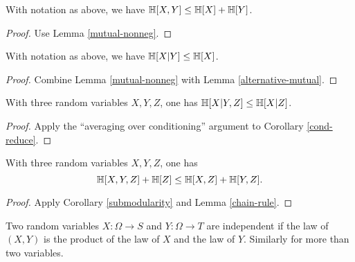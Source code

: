 \begin{corollary}[Subadditivity]
  \label{subadditive}
  \leanok
  With notation as above, we have $\mathbb{H}[X,Y] \leq \mathbb{H}[X] + \mathbb{H}[Y]$.
\end{corollary}

\begin{proof}
  \leanok
  Use Lemma \ref{mutual-nonneg}.
\end{proof}

\begin{corollary}
  \label{cond-reduce}
  \leanok
  With notation as above, we have $\mathbb{H}[X|Y] \leq \mathbb{H}[X]$.
\end{corollary}
\begin{proof}
  \leanok
  Combine Lemma \ref{mutual-nonneg} with Lemma \ref{alternative-mutual}.
\end{proof}

\begin{corollary}[Submodularity]\label{submodularity}
  \leanok
  With three random variables $X,Y,Z$, one has $\mathbb{H}[X|Y,Z] \leq \mathbb{H}[X|Z]$.
\end{corollary}

\begin{proof} \leanok Apply the ``averaging over conditioning'' argument to Corollary \ref{cond-reduce}.
\end{proof}

\begin{corollary}\label{alt-submodularity}
  \leanok
  With three random variables $X,Y,Z$, one has
  $$ \mathbb{H}[X,Y,Z] + \mathbb{H}[Z] \leq \mathbb{H}[X,Z] + \mathbb{H}[Y,Z].$$
\end{corollary}

\begin{proof}   \leanok Apply Corollary \ref{submodularity} and Lemma \ref{chain-rule}.
\end{proof}

\begin{definition}
  \label{independent-def}
  \leanok
  Two random variables $X: \Omega \to S$ and $Y: \Omega \to T$ are independent if the law of $(X,Y)$ is the product of the law of $X$ and the law of $Y$.  Similarly for more than two variables.
\end{definition}

